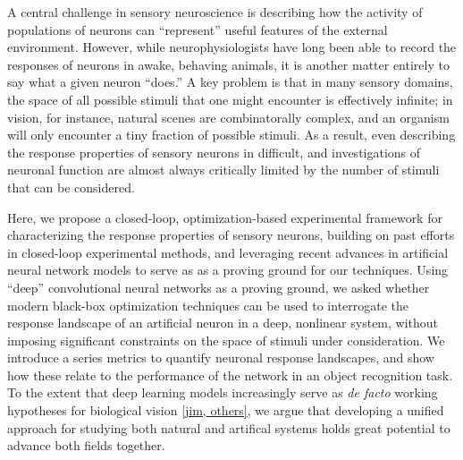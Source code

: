 
A central challenge in sensory neuroscience is describing how the activity of populations of neurons can ``represent'' useful features of the external environment.
However, while neurophysiologists have long been able to record the responses of neurons in awake, behaving animals, it is another matter entirely to say what a given neuron ``does.''
A key problem is that in many sensory domains, the space of all possible stimuli that one might encounter is effectively infinite; in vision, for instance, natural scenes are combinatorally complex, and an organism will only encounter a tiny fraction of possible stimuli.
As a result, even describing the response properties of sensory neurons in difficult, and investigations of neuronal function are almost always critically limited by the number of stimuli that can be considered.

Here, we propose a closed-loop, optimization-based experimental framework for characterizing the response properties of sensory neurons, building on past efforts in closed-loop experimental methods, and leveraging recent advances in artificial neural network models to serve as as a proving ground for our techniques.
Using ``deep'' convolutional neural networks as a proving ground, we asked whether modern black-box optimization techniques can be used to interrogate the response landscape of an artificial neuron in a deep, nonlinear system, without imposing significant constraints on the space of stimuli under consideration.
We introduce a series metrics to quantify neuronal response landscapes, and show how these relate to the performance of the network in an object recognition task.
To the extent that deep learning models increasingly serve as \emph{de facto} working hypotheses for biological vision \ref{jim, others}, we argue that developing a unified approach for studying both natural and artifical systems holds great potential to advance both fields together.